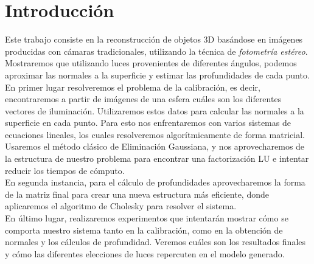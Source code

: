 \section{Introducción}


Este trabajo consiste en la reconstrucción de objetos 3D basándose en imágenes producidas con cámaras tradicionales, utilizando la técnica de \textit{fotometría estéreo}. Mostraremos que utilizando luces provenientes de diferentes ángulos, podemos aproximar las normales a la superficie y estimar las profundidades de cada punto. \\

En primer lugar resolveremos el problema de la calibración, es decir, encontraremos a partir de imágenes de una esfera cuáles son los diferentes vectores de iluminación. Utilizaremos estos datos para calcular las normales a la superficie en cada punto. Para esto nos enfrentaremos con varios sistemas de ecuaciones lineales, los cuales resolveremos algorítmicamente de forma matricial. Usaremos el método clásico de Eliminación Gaussiana, y nos aprovecharemos de la estructura de nuestro problema para encontrar una factorización LU e intentar reducir los tiempos de cómputo. \\

En segunda instancia, para el cálculo de profundidades aprovecharemos la forma de la matriz final para crear una nueva estructura más eficiente, donde aplicaremos el algoritmo de Cholesky para resolver el sistema. \\

En último lugar, realizaremos experimentos que intentarán mostrar cómo se comporta nuestro sistema tanto en la calibración, como en la obtención de normales y los cálculos de profundidad. Veremos cuáles son los resultados finales y cómo las diferentes elecciones de luces repercuten en el modelo generado. \\